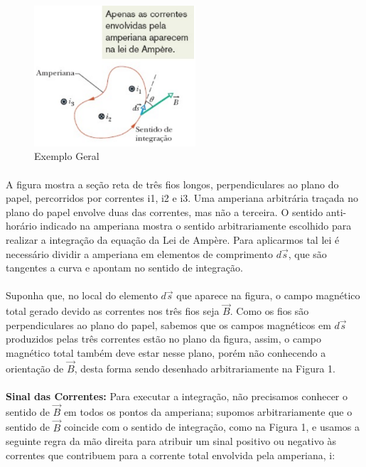 \documentclass[a4paper, 12pt]{article}
\begin{document}
\begin{figure}[h]
    \begin{center}
        \includegraphics[width=60mm]{Capturar.PNG}
    \end{center}
    \caption{Exemplo Geral}
    \label{Fig. Exemplo}
\end{figure}

\paragraph{} A figura mostra a seção reta de três fios longos, perpendiculares ao plano do papel, percorridos por correntes i1, i2 e i3. Uma amperiana arbitrária traçada no plano do papel envolve duas das correntes, mas não a terceira. O sentido anti-horário indicado na amperiana mostra o sentido arbitrariamente escolhido para realizar a integração da equação da Lei de Ampère. Para aplicarmos tal lei é necessário dividir a amperiana em elementos de comprimento $d\overrightarrow{s}$, que são tangentes a curva e apontam no sentido de integração.

\paragraph{} Suponha que, no local do elemento $d\overrightarrow{s}$ que aparece na figura, o campo magnético total gerado devido as correntes nos três fios seja $\overrightarrow{B}$. Como os fios são perpendiculares ao plano do papel, sabemos que os campos magnéticos em $d\overrightarrow{s}$ produzidos pelas três correntes estão no plano da figura, assim, o campo magnético total também deve estar nesse plano, porém não conhecendo a orientação de $\overrightarrow{B}$, desta forma sendo desenhado arbitrariamente na Figura 1.

\paragraph{} \textbf{Sinal das Correntes:} Para executar a integração, não precisamos conhecer o sentido de $\overrightarrow{B}$ em todos os pontos da amperiana; supomos arbitrariamente que o sentido de $\overrightarrow{B}$ coincide com o sentido de integração, como na Figura 1, e usamos a seguinte regra da mão direita para atribuir um sinal positivo ou negativo às correntes que contribuem para a corrente total envolvida pela amperiana, i:\\
\end{document}

